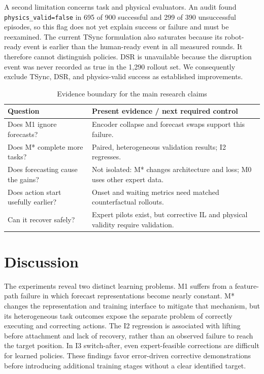 \documentclass[conference]{IEEEtran}
\begin{document}
A second limitation concerns task and physical evaluators. An audit found \texttt{physics\_valid=false} in 695 of 900 successful and 299 of 390 unsuccessful episodes, so this flag does not yet explain success or failure and must be reexamined. The current TSync formulation also saturates because its robot-ready event is earlier than the human-ready event in all measured rounds. It therefore cannot distinguish policies. DSR is unavailable because the disruption event was never recorded as true in the 1,290 rollout set. We consequently exclude TSync, DSR, and physics-valid success as established improvements.

\begin{table}[t]
\caption{Evidence boundary for the main research claims}
\label{tab:evidence}
\centering\footnotesize
\begin{tabular}{p{}p{}}
\toprule
Question & Present evidence / next required control\\
\midrule
Does M1 ignore forecasts? & Encoder collapse and forecast swaps support this failure.\\
Does M* complete more tasks? & Paired, heterogeneous validation results; I2 regresses.\\
Does forecasting cause the gains? & Not isolated: M* changes architecture and loss; M0 uses other expert data.\\
Does action start usefully earlier? & Onset and waiting metrics need matched counterfactual rollouts.\\
Can it recover safely? & Expert pilots exist, but corrective IL and physical validity require validation.\\
\bottomrule
\end{tabular}
\end{table}

\section{Discussion}
The experiments reveal two distinct learning problems. M1 suffers from a feature-path failure in which forecast representations become nearly constant. M* changes the representation and training interface to mitigate that mechanism, but its heterogeneous task outcomes expose the separate problem of correctly executing and correcting actions. The I2 regression is associated with lifting before attachment and lack of recovery, rather than an observed failure to reach the target position. In I3 switch-after, even expert-feasible corrections are difficult for learned policies. These findings favor error-driven corrective demonstrations before introducing additional training stages without a clear identified target.
\end{document}
